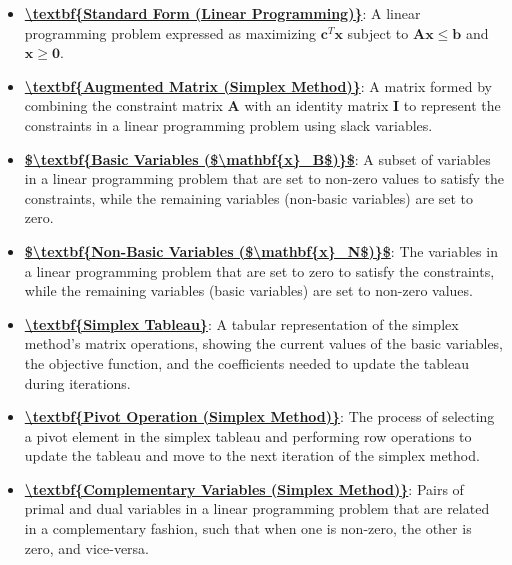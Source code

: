 \documentclass{article}%
\begin{document}
\begin{itemize}[leftmargin=*]%
\item \href{https://www.math.purdue.edu/~yipn/421//2024-09-24-SimplexMatrix.pdf#page=1}{\textbf{\textbackslash{}textbf\{Standard Form (Linear Programming)\}}}: A linear programming problem expressed as maximizing $\mathbf{c}^T \mathbf{x}$ subject to $\mathbf{A} \mathbf{x} \le \mathbf{b}$ and $\mathbf{x} \ge \mathbf{0}$.%
\item \href{https://www.math.purdue.edu/~yipn/421//2024-09-24-SimplexMatrix.pdf#page=3}{\textbf{\textbackslash{}textbf\{Augmented Matrix (Simplex Method)\}}}: A matrix formed by combining the constraint matrix $\mathbf{A}$ with an identity matrix $\mathbf{I}$ to represent the constraints in a linear programming problem using slack variables.%
\item \href{https://www.math.purdue.edu/~yipn/421//2024-09-24-SimplexMatrix.pdf#page=4}{\textbf{\$\textbackslash{}textbf\{Basic Variables (\$\textbackslash{}mathbf\{x\}\_B\$)\}\$}}: A subset of variables in a linear programming problem that are set to non-zero values to satisfy the constraints, while the remaining variables (non-basic variables) are set to zero.%
\item \href{https://www.math.purdue.edu/~yipn/421//2024-09-24-SimplexMatrix.pdf#page=4}{\textbf{\$\textbackslash{}textbf\{Non{-}Basic Variables (\$\textbackslash{}mathbf\{x\}\_N\$)\}\$}}: The variables in a linear programming problem that are set to zero to satisfy the constraints, while the remaining variables (basic variables) are set to non-zero values.%
\item \href{https://www.math.purdue.edu/~yipn/421//2024-09-24-SimplexMatrix.pdf#page=10}{\textbf{\textbackslash{}textbf\{Simplex Tableau\}}}: A tabular representation of the simplex method's matrix operations, showing the current values of the basic variables, the objective function, and the coefficients needed to update the tableau during iterations.%
\item \href{https://www.math.purdue.edu/~yipn/421//2024-09-24-SimplexMatrix.pdf#page=17}{\textbf{\textbackslash{}textbf\{Pivot Operation (Simplex Method)\}}}: The process of selecting a pivot element in the simplex tableau and performing row operations to update the tableau and move to the next iteration of the simplex method.%
\item \href{https://www.math.purdue.edu/~yipn/421//2024-09-24-SimplexMatrix.pdf#page=14}{\textbf{\textbackslash{}textbf\{Complementary Variables (Simplex Method)\}}}: Pairs of primal and dual variables in a linear programming problem that are related in a complementary fashion, such that when one is non-zero, the other is zero, and vice-versa.%

\end{itemize}
\end{document}

